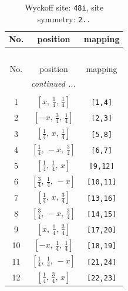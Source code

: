 \documentclass[fleqn,8pt]{jsarticle}
\begin{document}
\begin{longtable}{ccc}
\caption{Wyckoff site: {\tt 48i}, site symmetry: {\tt 2..}}
 \\
 \hline \hline
No. & position & mapping \\ \hline \endfirsthead

\multicolumn{2}{l}{\tablename\ \thetable{}} \\
 \hline \hline
No. & position & mapping \\ \hline \endhead

 \hline \hline
\multicolumn{2}{r}{\footnotesize\it continued ...} \\ \endfoot

 \hline \hline
\multicolumn{2}{r}{} \\ \endlastfoot

1 & $\left[ x,\, \frac{1}{4},\, \frac{1}{4} \right]$ & {\tt [1,4]} \\ \hline
2 & $\left[ - x,\, \frac{3}{4},\, \frac{1}{4} \right]$ & {\tt [2,3]} \\ \hline
3 & $\left[ \frac{1}{4},\, x,\, \frac{1}{4} \right]$ & {\tt [5,8]} \\ \hline
4 & $\left[ \frac{1}{4},\, - x,\, \frac{3}{4} \right]$ & {\tt [6,7]} \\ \hline
5 & $\left[ \frac{1}{4},\, \frac{1}{4},\, x \right]$ & {\tt [9,12]} \\ \hline
6 & $\left[ \frac{3}{4},\, \frac{1}{4},\, - x \right]$ & {\tt [10,11]} \\ \hline
7 & $\left[ \frac{1}{4},\, x,\, \frac{3}{4} \right]$ & {\tt [13,16]} \\ \hline
8 & $\left[ \frac{3}{4},\, - x,\, \frac{3}{4} \right]$ & {\tt [14,15]} \\ \hline
9 & $\left[ x,\, \frac{1}{4},\, \frac{3}{4} \right]$ & {\tt [17,20]} \\ \hline
10 & $\left[ - x,\, \frac{1}{4},\, \frac{1}{4} \right]$ & {\tt [18,19]} \\ \hline
11 & $\left[ \frac{1}{4},\, \frac{1}{4},\, - x \right]$ & {\tt [21,24]} \\ \hline
12 & $\left[ \frac{1}{4},\, \frac{3}{4},\, x \right]$ & {\tt [22,23]} \\
\end{longtable}
\renewcommand{\arraystretch}{1.2}
\end{document}

